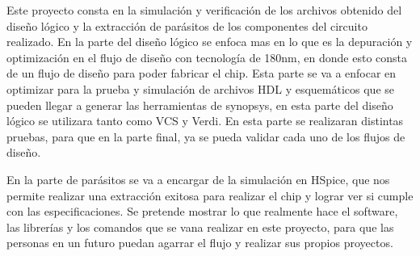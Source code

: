 

Este proyecto consta en la simulación y verificación de los archivos obtenido del diseño lógico y la extracción de parásitos de los componentes del circuito realizado. 
En la parte del diseño lógico se enfoca mas en lo que es la depuración y optimización en el flujo de diseño con tecnología de 180nm, en donde esto consta de un flujo de diseño para poder fabricar el chip. Esta parte se va a enfocar en optimizar para la prueba y simulación de archivos HDL y esquemáticos que se pueden llegar a generar las herramientas de synopsys, en esta parte del diseño lógico se utilizara tanto como VCS y Verdi.
En esta parte se realizaran distintas pruebas, para que en la parte final, ya se pueda validar cada uno de los flujos de diseño.

En la parte de parásitos se va a encargar de la simulación en HSpice, que nos permite realizar una extracción exitosa para realizar el chip y lograr ver si cumple con las especificaciones. Se pretende mostrar lo que realmente hace el software, las librerías y los comandos que se vana realizar en este proyecto, para que las personas en un futuro puedan agarrar el flujo y realizar sus propios proyectos.
